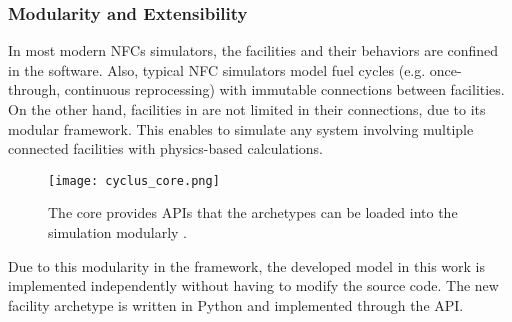 \subsubsection{Modularity and Extensibility}

In most modern \glspl{NFC} simulators, the facilities and their
behaviors are confined in the software.
Also, typical \gls{NFC} simulators model
fuel cycles (e.g. once-through, continuous reprocessing)
with immutable connections between facilities. On the other hand,
facilities in \Cyclus are not limited in their connections,
due to its modular framework.
This enables \Cyclus to simulate any system
involving multiple connected facilities with physics-based
calculations.

\begin{figure}[htbp!]
    \begin{center}
        \texttt{[image: cyclus\_core.png]}
    \end{center}
    \caption{The \Cyclus core provides APIs that the archetypes
            can be loaded into the simulation modularly
            \cite{huff_fundamental_2016}.}
    \label{fig:core}
\end{figure}

Due to this modularity in the \Cyclus framework, the developed
model in this work is implemented independently without
having to modify the \Cyclus source code. The new facility archetype
is written in Python and implemented through the \Cyclus API.
